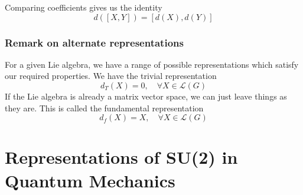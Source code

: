 \documentclass[11pt, oneside]{article}   	%
\theoremstyle{slanted}
\begin{document}
Comparing coefficients gives us the identity \[ d([X, Y]) = [d(X), d(Y)] \]

\subsubsection{Remark on alternate representations}
For a given Lie algebra, we have a range of possible representations which satisfy our required properties. We have the trivial representation \[ d_T(X) = 0, \quad \forall X \in \mathcal{L}(G) \]
If the Lie algebra is already a matrix vector space, we can just leave things as they are. This is called the fundamental representation
\[ d_f(X) = X, \quad \forall X \in \mathcal{L}(G) \]

\pagebreak 

\section{ Representations of SU(2) in Quantum Mechanics}
\end{document}
